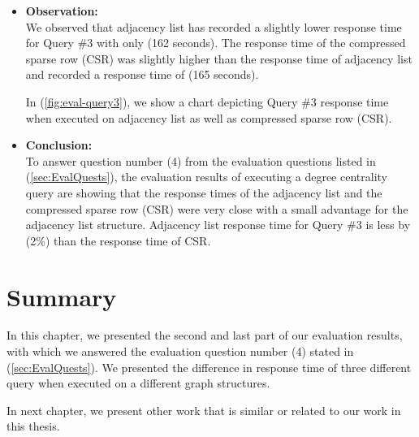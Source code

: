 {\begin{itemize}
\item \textbf{Observation:}\\
We observed that adjacency list has recorded a slightly lower response time for Query \#3 with only (162 seconds). The response time of the compressed sparse row (CSR) was slightly higher than the response time of adjacency list and recorded a response time of (165 seconds). 

In (\ref{fig:eval-query3}), we show a chart depicting Query \#3 response time when executed on adjacency list as well as compressed sparse row (CSR).

\item \textbf{Conclusion:}\\
To answer question number (4) from the evaluation questions listed in (\ref{sec:EvalQuests}), the evaluation results of executing a degree centrality query are showing that the response times of the adjacency list and the compressed sparse row (CSR) were very close with a small advantage for the adjacency list structure. Adjacency list response time for Query \#3 is less by (2\%) than the response time of CSR.


\end{itemize}


\section{Summary}
\label{sec:eval-summary_part2}

In this chapter, we presented the second and last part of our evaluation results, with which we answered the evaluation question number (4) stated in (\ref{sec:EvalQuests}). We presented the difference in response time of three different query when executed on a different graph structures.

In next chapter, we present other work that is similar or related to our work in this thesis.


}